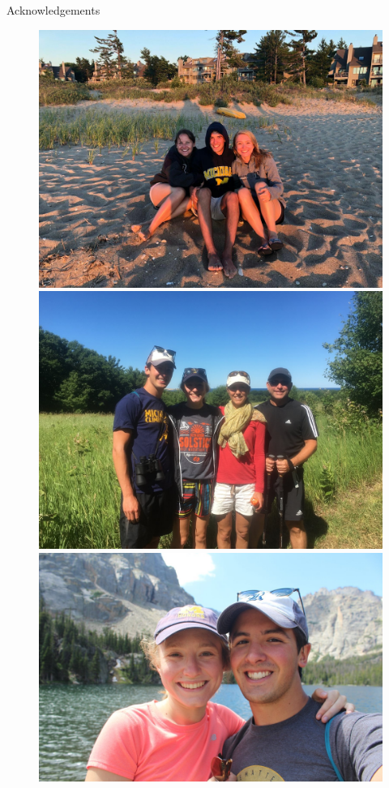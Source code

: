 \documentclass[]{beamer}
\begin{document}
\begin{frame}[noframenumbering]{Acknowledgements}
\begin{figure}
\begin{minipage}{0.49\linewidth}
			\includegraphics[width=0.8\linewidth,trim={0em 0em 0em 30em},clip]{Images/ack/IMG_6974.jpg}
		\end{minipage}
		\begin{minipage}{0.49\linewidth}
			\centering
			\includegraphics[width=0.8\linewidth,trim={0em 20em 0em 20em},clip]{Images/ack/IMG_0564.JPG}

			\includegraphics[width=0.8\linewidth,trim={0em 0em 0em 10em},clip]{Images/ack/IMG_7124.jpg}


\end{minipage}
\end{figure}
\end{frame}
\end{document}
